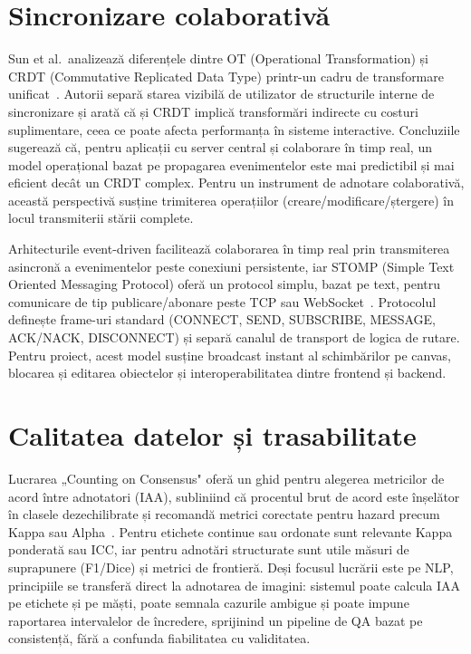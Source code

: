 \section{Sincronizare colaborativă}

Sun et al.\ analizează diferențele dintre OT (Operational Transformation) și CRDT (Commutative Replicated Data Type) printr-un cadru de transformare unificat~\cite{Sun2020OTCRDT}. Autorii separă starea vizibilă de utilizator de structurile interne de sincronizare și arată că și CRDT implică transformări indirecte cu costuri suplimentare, ceea ce poate afecta performanța în sisteme interactive. Concluziile sugerează că, pentru aplicații cu server central și colaborare în timp real, un model operațional bazat pe propagarea evenimentelor este mai predictibil și mai eficient decât un CRDT complex. Pentru un instrument de adnotare colaborativă, această perspectivă susține trimiterea operațiilor (creare/modificare/ștergere) în locul transmiterii stării complete.

Arhitecturile event-driven facilitează colaborarea în timp real prin transmiterea asincronă a evenimentelor peste conexiuni persistente, iar STOMP (Simple Text Oriented Messaging Protocol) oferă un protocol simplu, bazat pe text, pentru comunicare de tip publicare/abonare peste TCP sau WebSocket~\cite{stomp_spec_1_2}. Protocolul definește frame-uri standard (CONNECT, SEND, SUBSCRIBE, MESSAGE, ACK/NACK, DISCONNECT) și separă canalul de transport de logica de rutare. Pentru proiect, acest model susține broadcast instant al schimbărilor pe canvas, blocarea și editarea obiectelor și interoperabilitatea dintre frontend și backend.

\section{Calitatea datelor și trasabilitate}

Lucrarea „Counting on Consensus" oferă un ghid pentru alegerea metricilor de acord între adnotatori (IAA), subliniind că procentul brut de acord este înșelător în clasele dezechilibrate și recomandă metrici corectate pentru hazard precum Kappa sau Alpha~\cite{james2026countingconsensusselectingright}. Pentru etichete continue sau ordonate sunt relevante Kappa ponderată sau ICC, iar pentru adnotări structurate sunt utile măsuri de suprapunere (F1/Dice) și metrici de frontieră. Deși focusul lucrării este pe NLP, principiile se transferă direct la adnotarea de imagini: sistemul poate calcula IAA pe etichete și pe măști, poate semnala cazurile ambigue și poate impune raportarea intervalelor de încredere, sprijinind un pipeline de QA bazat pe consistență, fără a confunda fiabilitatea cu validitatea.

